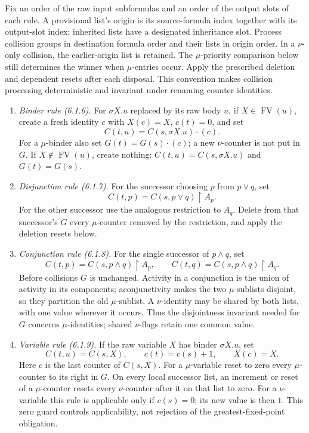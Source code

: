 Fix an order of the raw input subformulas and an order
of the output slots of each rule. A provisional list's
origin is its source-formula index together with its
output-slot index; inherited lists have a designated
inheritance slot. Process collision groups in destination
formula order and their lists in origin order.
In a \(\nu\)-only collision, the earlier-origin list
is retained. The \(\mu\)-priority comparison below
still determines the winner when \(\mu\)-entries occur.
Apply the prescribed deletion and dependent resets
after each disposal. This convention makes collision
processing deterministic and invariant under renaming
counter identities.
\begin{enumerate}
\item \emph{Binder rule (6.1.6).}
For \(\sigma X.u\) replaced by its raw body \(u\), if
\(X\in\operatorname{FV}(u)\), create a fresh identity \(c\)
with \(X(c)=X\), \(c(t)=0\), and set
\[
 C(t,u)=C(s,\sigma X.u)\mathbin{\cdot}(c).
\]
For a \(\mu\)-binder also set
\(G(t)=G(s)\mathbin{\cdot}(c)\); a new \(\nu\)-counter
is not put in \(G\). If \(X\notin\operatorname{FV}(u)\),
create nothing: \(C(t,u)=C(s,\sigma X.u)\) and
\(G(t)=G(s)\).

\item \emph{Disjunction rule (6.1.7).}
For the successor choosing \(p\) from \(p\lor q\), set
\[
 C(t,p)=C(s,p\lor q)\upharpoonright A_p.
\]
For the other successor use the analogous restriction to \(A_q\).
Delete from that successor's \(G\) every \(\mu\)-counter
removed by the restriction, and apply the deletion resets below.

\item \emph{Conjunction rule (6.1.8).}
For the single successor of \(p\land q\), set
\[
 C(t,p)=C(s,p\land q)\upharpoonright A_p,\qquad
 C(t,q)=C(s,p\land q)\upharpoonright A_q.
\]
Before collisions \(G\) is unchanged. Activity in a conjunction
is the union of activity in its components; aconjunctivity makes
the two \(\mu\)-sublists disjoint, so they partition the old
\(\mu\)-sublist. A \(\nu\)-identity may be shared by both
lists, with one value wherever it occurs. Thus the disjointness
invariant needed for \(G\) concerns \(\mu\)-identities;
shared \(\nu\)-flags retain one common value.

\item \emph{Variable rule (6.1.9).}
If the raw variable \(X\) has binder \(\sigma X.u\), set
\[
 C(t,u)=C(s,X),\qquad c(t)=c(s)+1,
 \qquad X(c)=X.
\]
Here \(c\) is the last counter of \(C(s,X)\).
For a \(\mu\)-variable reset to zero every \(\mu\)-counter
to its right in \(G\). On every local successor list, an
increment or reset of a \(\mu\)-counter resets every
\(\nu\)-counter after it on that list to zero.
For a \(\nu\)-variable this rule is applicable only if
\(c(s)=0\); its new value is then \(1\).
This zero guard controls applicability, not rejection of the
greatest-fixed-point obligation.


\end{enumerate}
